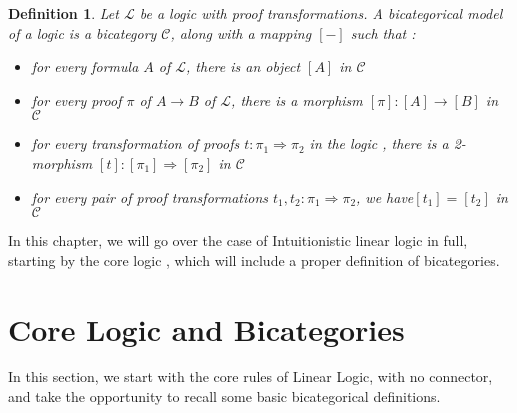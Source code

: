 \documentclass[a4paper, 12pt, twoside,openright]{report}
\newtheorem{definition}{Definition}
\begin{document}
\begin{definition}
Let $\mathcal{L}$ be a logic with proof transformations. A bicategorical model of a logic is a bicategory $\mathcal{C}$, along with a mapping $[ - ]$ such that : 
\begin{itemize}
\item for every formula $A$ of $\mathcal{L}$, there is an object $[A]$ in $\mathcal{C}$
\item for every proof $\pi$ of $A\rightarrow B$ of $\mathcal{L}$, there is a morphism $[\pi]: [A] \rightarrow [B]$ in $\mathcal{C}$
\item for every transformation of proofs $t:\pi_1 \Rightarrow \pi_2$ in the logic , there is a 2-morphism $[t]: [\pi_1]\Rightarrow [\pi_2]$ in  $\mathcal{C}$
\item for every pair of proof transformations $t_1, t_2: \pi_1 \Rightarrow \pi_2$, we have$[t_1]=[t_2]$ in  $\mathcal{C}$
\end{itemize}

\end{definition}  

In this chapter, we will go over the case of Intuitionistic linear logic in full, starting by the core logic , which will include a proper definition of bicategories. 

\section{Core Logic and Bicategories} 
In this section, we start with the core rules of Linear Logic, with no connector, and take the opportunity to recall some basic bicategorical definitions.\\
\end{document}
